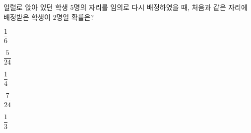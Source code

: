 일렬로 앉아 있던 학생 $5$명의 자리를 임의로 다시 배정하였을 때, 처음과 같은 자리에 배정받은 학생이 $2$명일 확률은?
\begin{choices32}{\rule[-3ex]{0pt}{8ex}$\dfrac{1}{6}$}{\rule[-3ex]{0pt}{8ex}$\dfrac{5}{24}$}{\rule[-3ex]{0pt}{8ex}$\dfrac{1}{4}$}{\rule[-3ex]{0pt}{8ex}$\dfrac{7}{24}$}{\rule[-3ex]{0pt}{8ex}$\dfrac{1}{3}$}\end{choices32}
